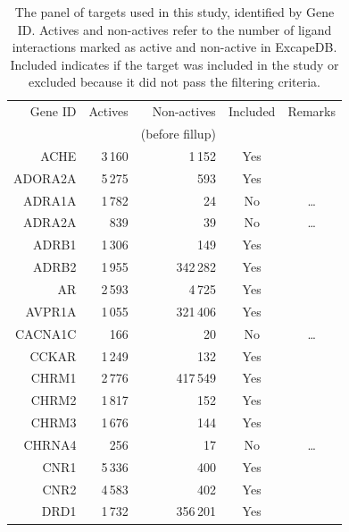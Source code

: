 \documentclass[10pt,article]{memoir}
\begin{document}
\begin{table}
\small
\centering
\caption{The panel of targets used in this study, identified by Gene ID. Actives and non-actives refer to the number of ligand interactions marked as active and non-active in ExcapeDB. Included indicates if the target was included in the study or excluded because it did not pass the filtering criteria.}
\label{tbl:targets}
\begin{tabular}{rrrcc}
\toprule
    Gene ID & Actives & Non-actives     & Included & Remarks \\ 
            &         & (before fillup) &          &         \\ 
\midrule
    ACHE    &       3\,160  &       1\,152      &   Yes     &       \\
    ADORA2A &       5\,275  &       593         &   Yes     &       \\
    ADRA1A  &       1\,782  &       24          &   No      &       \ldots     \\
    ADRA2A  &       839     &       39          &   No      &       \ldots     \\
    ADRB1   &       1\,306  &       149         &   Yes     &       \\
    ADRB2   &       1\,955  &       342\,282    &   Yes     &       \\
    AR      &       2\,593  &       4\,725      &   Yes     &       \\
    AVPR1A  &       1\,055  &       321\,406    &   Yes     &       \\
    CACNA1C &       166     &       20          &   No      &       \ldots     \\
    CCKAR   &       1\,249  &       132         &   Yes     &       \\
    CHRM1   &       2\,776  &       417\,549    &   Yes     &       \\
    CHRM2   &       1\,817  &       152         &   Yes     &       \\
    CHRM3   &       1\,676  &       144         &   Yes     &       \\
    CHRNA4  &       256     &       17          &   No      &       \ldots     \\
    CNR1    &       5\,336  &       400         &   Yes     &       \\
    CNR2    &       4\,583  &       402         &   Yes     &       \\
    DRD1    &       1\,732  &       356\,201    &   Yes     &       \\

\end{tabular}
\end{table}
\end{document}
